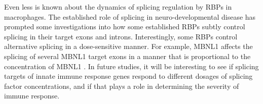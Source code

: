 Even less is known about the dynamics of splicing regulation by RBPs in macrophages. The established role of splicing in neuro-developmental disease has prompted some investigations into how some established RBPs subtly control splicing in their target exons and introns. Interestingly, some RBPs control alternative splicing in a dose-sensitive manner. For example, MBNL1 affects the splicing of several MBNL1 target exons in a manner that is proportional to the concentration of MBNL1 \cite{Wagner2016-kl}. In future studies, it will be interesting to see if splicing targets of innate immune response genes respond to different dosages of splicing factor concentrations, and if that plays a role in determining the severity of immune response. \\






